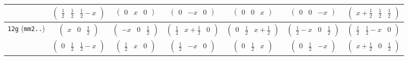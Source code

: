 \documentclass[fleqn,9pt,landscape]{jsarticle}
\begin{document}
\begin{center}
\begin{longtable}{ccccccc}
& $ \begin{pmatrix} \frac{1}{2} & \frac{1}{2} & \frac{1}{2} - x \end{pmatrix} $ & $ \begin{pmatrix} 0 & x & 0 \end{pmatrix} $ & $ \begin{pmatrix} 0 & - x & 0 \end{pmatrix} $ & $ \begin{pmatrix} 0 & 0 & x \end{pmatrix} $ & $ \begin{pmatrix} 0 & 0 & - x \end{pmatrix} $ & $ \begin{pmatrix} x + \frac{1}{2} & \frac{1}{2} & \frac{1}{2} \end{pmatrix} $ \\ \hline
{\tt 12g} ({\tt mm2..}) & $ \begin{pmatrix} x & 0 & \frac{1}{2} \end{pmatrix} $ & $ \begin{pmatrix} - x & 0 & \frac{1}{2} \end{pmatrix} $ & $ \begin{pmatrix} \frac{1}{2} & x + \frac{1}{2} & 0 \end{pmatrix} $ & $ \begin{pmatrix} 0 & \frac{1}{2} & x + \frac{1}{2} \end{pmatrix} $ & $ \begin{pmatrix} \frac{1}{2} - x & 0 & \frac{1}{2} \end{pmatrix} $ & $ \begin{pmatrix} \frac{1}{2} & \frac{1}{2} - x & 0 \end{pmatrix} $ \\
& $ \begin{pmatrix} 0 & \frac{1}{2} & \frac{1}{2} - x \end{pmatrix} $ & $ \begin{pmatrix} \frac{1}{2} & x & 0 \end{pmatrix} $ & $ \begin{pmatrix} \frac{1}{2} & - x & 0 \end{pmatrix} $ & $ \begin{pmatrix} 0 & \frac{1}{2} & x \end{pmatrix} $ & $ \begin{pmatrix} 0 & \frac{1}{2} & - x \end{pmatrix} $ & $ \begin{pmatrix} x + \frac{1}{2} & 0 & \frac{1}{2} \end{pmatrix} $ \\ \hline

\end{longtable}
\end{center}
\end{document}
